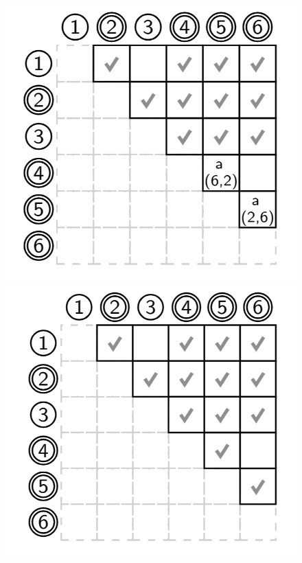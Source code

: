 \begin{enumerate}
\begin{figure}[H]
            \includegraphics[scale=0.175]{img/cap2/amin6.png}
            \includegraphics[scale=0.175]{img/cap2/amin7.png}

\end{figure}
\end{enumerate}
